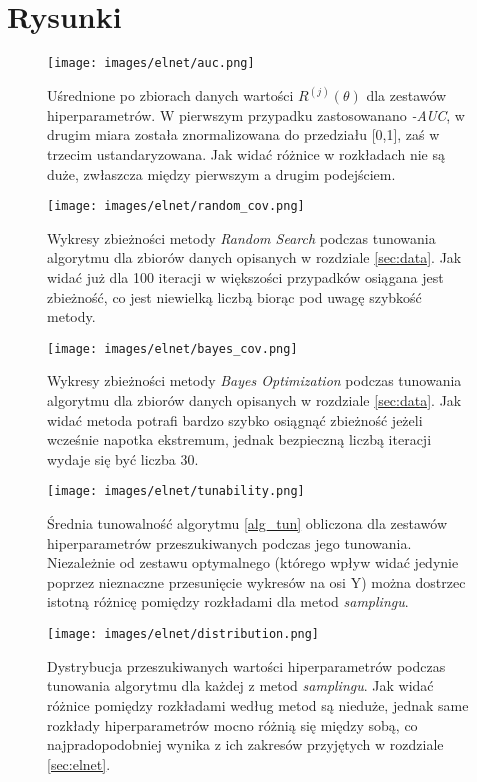 \documentclass[a4paper,11pt]{article}
\begin{document}
\section*{Rysunki}
\begin{figure}[H]
    \centering
    \texttt{[image: images/elnet/auc.png]}
    \vspace{1ex}
    \caption{Uśrednione po zbiorach danych wartości $R^{(j)}(\theta)$ dla zestawów hiperparametrów. W pierwszym przypadku zastosowanano \textit{-AUC}, w drugim miara została znormalizowana do przedziału [0,1], zaś w trzecim ustandaryzowana. Jak widać różnice w rozkładach nie są duże, zwłaszcza między pierwszym a drugim podejściem.}
    \label{fig:elnet:auc}
\end{figure}
\begin{figure}[H]
    \centering
    \texttt{[image: images/elnet/random\_cov.png]}
    \vspace{1ex}
    \caption{Wykresy zbieżności metody \textit{Random Search} podczas tunowania algorytmu dla zbiorów danych opisanych w rozdziale \ref{sec:data}. Jak widać już dla 100 iteracji w większości przypadków osiągana jest zbieżność, co jest niewielką liczbą biorąc pod uwagę szybkość metody.}
    \label{fig:elnet:rs}
\end{figure}
\begin{figure}[H]
    \centering
    \texttt{[image: images/elnet/bayes\_cov.png]}
    \vspace{1ex}
    \caption{Wykresy zbieżności metody \textit{Bayes Optimization} podczas tunowania algorytmu dla zbiorów danych opisanych w rozdziale \ref{sec:data}. Jak widać metoda potrafi bardzo szybko osiągnąć zbieżność jeżeli wcześnie napotka ekstremum, jednak bezpieczną liczbą iteracji wydaje się być liczba 30.}
    \label{fig:elnet:bo}
\end{figure}
\begin{figure}[H]
    \centering
    \texttt{[image: images/elnet/tunability.png]}
    \vspace{1ex}
    \caption{Średnia tunowalność algorytmu \eqref{alg_tun} obliczona dla zestawów hiperparametrów przeszukiwanych podczas jego tunowania. Niezależnie od zestawu optymalnego (którego wpływ widać jedynie poprzez nieznaczne przesunięcie wykresów na osi Y) można dostrzec istotną różnicę pomiędzy rozkładami dla metod \textit{samplingu}.}
    \label{fig:elnet:tun}
\end{figure}
\begin{figure}[H]
    \centering
    \texttt{[image: images/elnet/distribution.png]}
    \vspace{1ex}
    \caption{Dystrybucja przeszukiwanych wartości hiperparametrów podczas tunowania algorytmu dla każdej z metod \textit{samplingu}. Jak widać różnice pomiędzy rozkładami według metod są nieduże, jednak same rozkłady hiperparametrów mocno różnią się między sobą, co najpradopodobniej wynika z ich zakresów przyjętych w rozdziale \ref{sec:elnet}.}
    \label{fig:elnet:dist}
\end{figure}
\end{document}
